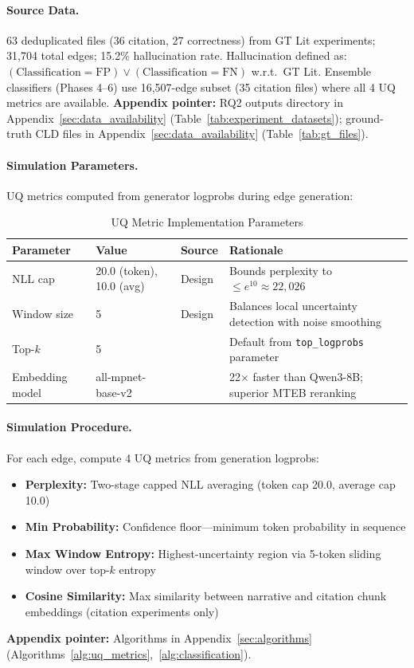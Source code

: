\paragraph{Source Data.}
63 deduplicated files (36 citation, 27 correctness) from GT Lit experiments; 31,704 total edges; 15.2\% hallucination rate. Hallucination defined as: $(\text{Classification} = \text{FP}) \lor (\text{Classification} = \text{FN})$ w.r.t.\ GT Lit. Ensemble classifiers (Phases 4--6) use 16,507-edge subset (35 citation files) where all 4 UQ metrics are available.
\textbf{Appendix pointer:} RQ2 outputs directory in Appendix~\ref{sec:data_availability} (Table~\ref{tab:experiment_datasets}); ground-truth CLD files in Appendix~\ref{sec:data_availability} (Table~\ref{tab:gt_files}).

\paragraph{Simulation Parameters.}
UQ metrics computed from generator logprobs during edge generation:
\begin{table}[H]
\centering
\caption{UQ Metric Implementation Parameters}
\label{tab:uq_params}
\footnotesize
\begin{tabularx}{\textwidth}{@{}l l l X@{}}
\toprule
\textbf{Parameter} & \textbf{Value} & \textbf{Source} & \textbf{Rationale} \\
\midrule
NLL cap & 20.0 (token), 10.0 (avg) & Design & Bounds perplexity to $\leq e^{10} \approx 22{,}026$ \\
Window size & 5 & Design & Balances local uncertainty detection with noise smoothing \\
Top-$k$ & 5 & \cite{openai2024api} & Default from \texttt{top\_logprobs} parameter \\
Embedding model & all-mpnet-base-v2 & \cite{muennighoff2023mteb} & 22$\times$ faster than Qwen3-8B; superior MTEB reranking \\
\bottomrule
\end{tabularx}
\end{table}

\paragraph{Simulation Procedure.}
For each edge, compute 4 UQ metrics from generation logprobs:
\begin{itemize}[noitemsep]
    \item \textbf{Perplexity:} Two-stage capped NLL averaging (token cap 20.0, average cap 10.0)
    \item \textbf{Min Probability:} Confidence floor---minimum token probability in sequence
    \item \textbf{Max Window Entropy:} Highest-uncertainty region via 5-token sliding window over top-$k$ entropy
    \item \textbf{Cosine Similarity:} Max similarity between narrative and citation chunk embeddings (citation experiments only)
\end{itemize}
\textbf{Appendix pointer:} Algorithms in Appendix~\ref{sec:algorithms} (Algorithms~\ref{alg:uq_metrics},~\ref{alg:classification}).

